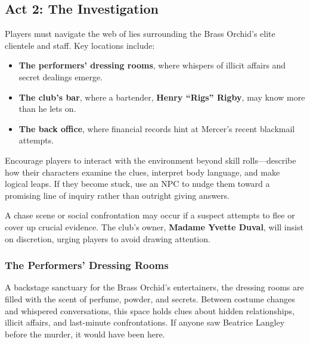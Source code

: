 \subsection{Act 2: The Investigation} 

Players must navigate the web of lies surrounding the Brass Orchid’s elite clientele and staff. Key locations include:
\begin{WyrdExplanation}
	\begin{itemize}
		\item \textbf{The performers’ dressing rooms}, where whispers of illicit affairs and secret dealings emerge.
		\item \textbf{The club’s bar}, where a bartender, \textbf{Henry ``Rigs'' Rigby}, may know more than he lets on.
		\item \textbf{The back office}, where financial records hint at Mercer’s recent blackmail attempts.
	\end{itemize}
\end{WyrdExplanation}

\begin{WyrdGmTips}
	Encourage players to interact with the environment beyond skill rolls—describe how their characters examine the clues, interpret body language, and make logical leaps. If they become stuck, use an NPC to nudge them toward a promising line of inquiry rather than outright giving answers.
\end{WyrdGmTips}

\noindent
A chase scene or social confrontation may occur if a suspect attempts to flee or cover up crucial evidence. The club’s owner, \textbf{Madame Yvette Duval}, will insist on discretion, urging players to avoid drawing attention.




\subsubsection{The Performers’ Dressing Rooms}
A backstage sanctuary for the Brass Orchid’s entertainers, the dressing rooms are filled with the scent of perfume, powder, and secrets. Between costume changes and whispered conversations, this space holds clues about hidden relationships, illicit affairs, and last-minute confrontations. If anyone saw Beatrice Langley before the murder, it would have been here.


